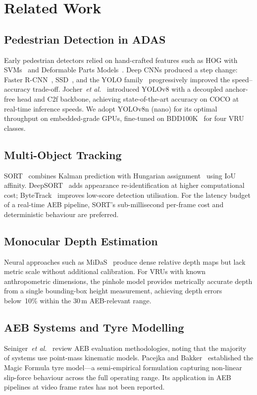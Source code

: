 \documentclass[journal]{IEEEtran}
\newcommand{\etal}{\textit{et al.}}
\begin{document}
\section{Related Work}
\label{sec:related}

\subsection{Pedestrian Detection in ADAS}
Early pedestrian detectors relied on hand-crafted features such as HOG
with SVMs~\cite{dalal2005} and Deformable Parts Models~\cite{felz2010}.
Deep CNNs produced a step change: Faster R-CNN~\cite{ren2017},
SSD~\cite{liu2016ssd}, and the YOLO family~\cite{redmon2018} progressively
improved the speed--accuracy trade-off.
Jocher~\etal~\cite{jocher2023} introduced YOLOv8 with a decoupled
anchor-free head and C2f backbone, achieving state-of-the-art accuracy
on COCO at real-time inference speeds.
We adopt YOLOv8n (nano) for its optimal throughput on embedded-grade
GPUs, fine-tuned on BDD100K~\cite{yu2020} for four VRU classes.

\subsection{Multi-Object Tracking}
SORT~\cite{bewley2016} combines Kalman prediction with Hungarian
assignment~\cite{kuhn1955} using IoU affinity.
DeepSORT~\cite{wojke2017} adds appearance re-identification at higher
computational cost; ByteTrack~\cite{zhang2022} improves low-score
detection utilisation.
For the latency budget of a real-time AEB pipeline, SORT's
sub-millisecond per-frame cost and deterministic behaviour are preferred.

\subsection{Monocular Depth Estimation}
Neural approaches such as MiDaS~\cite{ranftl2022} produce dense relative
depth maps but lack metric scale without additional calibration.
For VRUs with known anthropometric dimensions, the pinhole model provides
metrically accurate depth from a single bounding-box height measurement,
achieving depth errors below~10\% within the 30\,m AEB-relevant range.

\subsection{AEB Systems and Tyre Modelling}
Seiniger~\etal~\cite{seiniger2012} review AEB evaluation methodologies,
noting that the majority of systems use point-mass kinematic models.
Pacejka and Bakker~\cite{pacejka1992} established the Magic Formula tyre
model---a semi-empirical formulation capturing non-linear slip-force
behaviour across the full operating range.
Its application in AEB pipelines at video frame rates has not been
reported.
\end{document}
